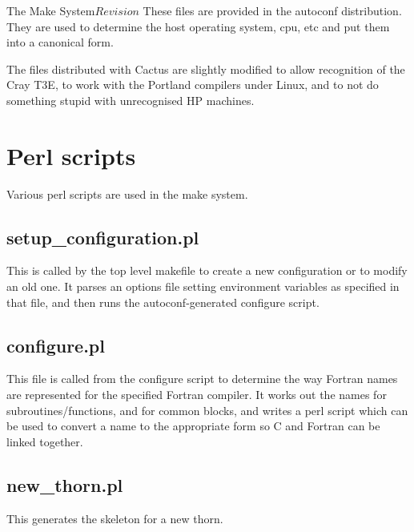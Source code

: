 \begin{cactuspart}{3}{The Make System}{}{$Revision$}
These files are provided in the autoconf distribution.  They are used to
determine the host operating system, cpu, etc and put them into a
canonical form.

The files distributed with Cactus are slightly modified to allow recognition
of the Cray T3E, to work with the Portland compilers under Linux, and to
not do something stupid with unrecognised HP machines.

\chapter{Perl scripts}
\label{ch:perlscripts}

Various perl scripts are used in the make system.

\section{setup\_configuration.pl}
\label{sec:perlscripts:setup}

This is called by the top level makefile to create a new configuration or
to modify an old one.  It parses an options file setting environment 
variables as specified in that file, and then runs the autoconf-generated
configure script.

\section{configure.pl}
\label{sec:perlscripts:configure}

This file is called from the configure script to determine the way Fortran
names are represented for the specified Fortran compiler.  It works out the
names for subroutines/functions, and for common blocks, and writes a
perl script which can be used to convert a name to the appropriate form so
C and Fortran can be linked together.

\section{new\_thorn.pl}
\label{sec:perlscripts:newthorn}

This generates the skeleton for a new thorn.

\end{cactuspart}
